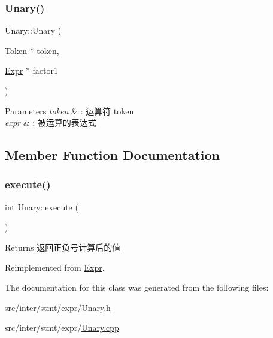 \subsubsection{\texorpdfstring{Unary()}{Unary()}}
{\footnotesize\ttfamily Unary\+::\+Unary (\begin{DoxyParamCaption}\item[{\hyperlink{class_token}{Token} $\ast$}]{token,  }\item[{\hyperlink{class_expr}{Expr} $\ast$}]{factor1 }\end{DoxyParamCaption})}


\begin{DoxyParams}{Parameters}
{\em token} & \+: 运算符 token \\
\hline
{\em expr} & \+: 被运算的表达式 \\
\hline
\end{DoxyParams}


\subsection{Member Function Documentation}
\mbox{\label{class_unary_af42edff1ee4718a9afeb7127e41af758}} 
\subsubsection{\texorpdfstring{execute()}{execute()}}
{\footnotesize\ttfamily int Unary\+::execute (\begin{DoxyParamCaption}{ }\end{DoxyParamCaption})\hspace{0.3cm}{\ttfamily [virtual]}}

\begin{DoxyReturn}{Returns}
返回正负号计算后的值 
\end{DoxyReturn}


Reimplemented from \hyperlink{class_expr_aff6a2e6eaa460e2a3db28ebdab089b51}{Expr}.



The documentation for this class was generated from the following files\+:\begin{DoxyCompactItemize}
\item 
src/inter/stmt/expr/\hyperlink{_unary_8h}{Unary.\+h}\item 
src/inter/stmt/expr/\hyperlink{_unary_8cpp}{Unary.\+cpp}\end{DoxyCompactItemize}
